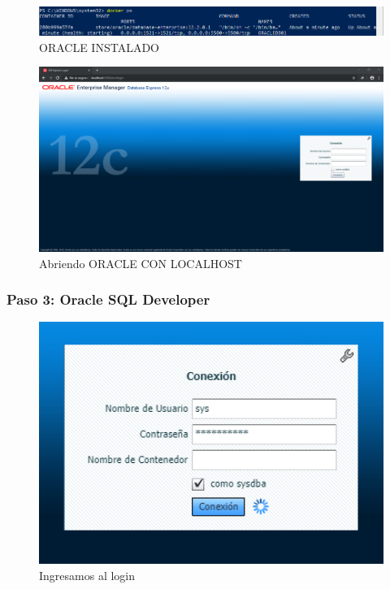 \documentclass[preprint,12pt]{elsarticle}
\begin{document}
\begin{figure}[H]
	\begin{center}
		\includegraphics[width=12cm]{./IMAGENES/IMAGEN4} 
		\caption{ORACLE INSTALADO}
	\end{center}
\end{figure}

\begin{figure}[H]
	\begin{center}
		\includegraphics[width=12cm]{./IMAGENES/IMAGEN7} 
		\caption{Abriendo ORACLE CON LOCALHOST}
	\end{center}
\end{figure}

\subsubsection{\textbf{Paso 3: Oracle SQL Developer}}
\begin{figure}[H]
	\begin{center}
		\includegraphics[width=12cm]{./IMAGENES/IMAGEN8} 
		\caption{Ingresamos al login}
	\end{center}
\end{figure}
\end{document}
